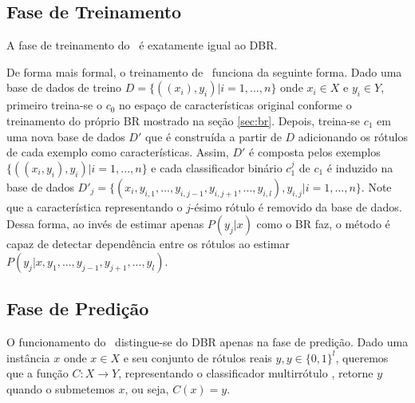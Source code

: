  
 \subsection{Fase de Treinamento}
  A fase de treinamento do \MRLMa~é exatamente igual ao DBR.
  
  De forma mais formal, o treinamento de \MRLM~funciona da seguinte forma.
  Dado uma base de dados de treino $D=\{((x_i),y_i)|i=1,...,n\}$ onde $x_i \in X$ e $y_i \in Y$,
  primeiro treina-se o $c_0$
  no espaço de características original conforme o treinamento do próprio BR mostrado na seção \ref{sec:br}.
  Depois, treina-se $c_1$ em uma nova base de dados $D'$ que é construída a partir de $D$ adicionando os rótulos de cada
  exemplo como características. Assim, $D'$ é composta pelos exemplos $\{((x_i,y_i),y_i) |i=1,...,n\}$ e
  cada classificador binário $c_1^j$ de $c_1$ é induzido na base de dados $D'_j=\{(x_i,y_{i,1},...,y_{i,j-1},y_{i,j+1},...,y_{i,l}),y_{i,j} | i=1,...,n\}$.
  Note que a característica representando o $j$-ésimo rótulo é removido da base de dados.
  Dessa forma, ao invés de estimar apenas $P(y_j|x)$ como o BR faz, o método é capaz de detectar dependência entre os rótulos ao
  estimar $P(y_j|x,y_1,...,y_{j-1},y_{j+1},...,y_l)$.
 
 \subsection{Fase de Predição}
 \label{sec:mrlm_prediction}
 O funcionamento do \MRLMa~distingue-se do DBR apenas na fase de predição.
 Dado uma instância $x$ onde $x\in X$ e seu conjunto de rótulos reais $y,y \in {\{0,1\}}^l$, queremos que a função $C:X\rightarrow Y$,
 representando o classificador multirrótulo \MRLMa, retorne $y$ quando o submetemos $x$, ou seja, $C(x)=y$.
 
